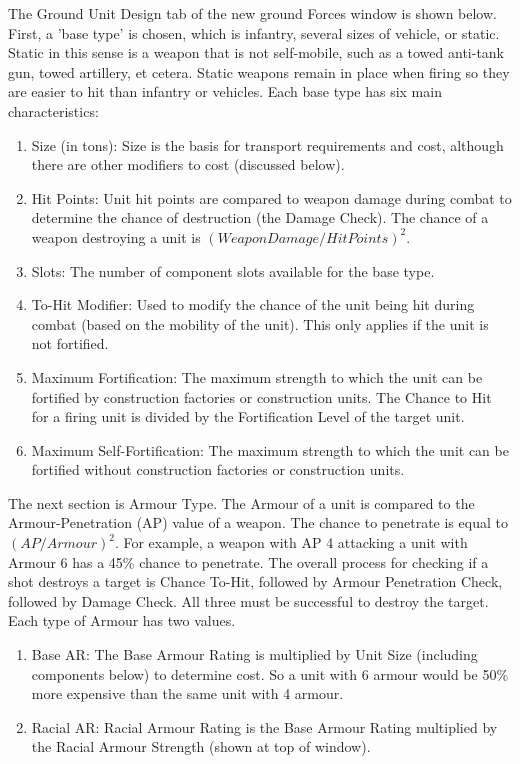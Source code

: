 \documentclass[../../../Aurora C# unofficial manual.tex]{subfiles}
\begin{document}
	The Ground Unit Design tab of the new ground Forces window is shown below. First, a 'base type' is chosen, which is infantry, several sizes of vehicle, or static. Static in this sense is a weapon that is not self-mobile, such as a towed anti-tank gun, towed artillery, et cetera. Static weapons remain in place when firing so they are easier to hit than infantry or vehicles. Each base type has six main characteristics:
	\begin{enumerate}
		\item Size (in tons): Size is the basis for transport requirements and cost, although there are other modifiers to cost (discussed below).
		\item Hit Points: Unit hit points are compared to weapon damage during combat to determine the chance of destruction (the Damage Check). The chance of a weapon destroying a unit is \( (Weapon Damage / Hit Points)^{2} \).
		\item Slots: The number of component slots available for the base type.
		\item To-Hit Modifier: Used to modify the chance of the unit being hit during combat (based on the mobility of the unit). This only applies if the unit is not fortified.
		\item Maximum Fortification: The maximum strength to which the unit can be fortified by construction factories or construction units. The Chance to Hit for a firing unit is divided by the Fortification Level of the target unit.
		\item Maximum Self-Fortification: The maximum strength to which the unit can be fortified without construction factories or construction units.
	\end{enumerate}
	
	The next section is Armour Type. The Armour of a unit is compared to the Armour-Penetration (AP) value of a weapon. The chance to penetrate is equal to \( (AP / Armour)^{2} \). For example, a weapon with AP 4 attacking a unit with Armour 6 has a 45\% chance to penetrate. The overall process for checking if a shot destroys a target is Chance To-Hit, followed by Armour Penetration Check, followed by Damage Check. All three must be successful to destroy the target. Each type of Armour has two values.
	\begin{enumerate}
		\item Base AR: The Base Armour Rating is multiplied by Unit Size (including components below) to determine cost. So a unit with 6 armour would be 50\% more expensive than the same unit with 4 armour.
		\item Racial AR: Racial Armour Rating is the Base Armour Rating multiplied by the Racial Armour Strength (shown at top of window).
	\end{enumerate}
	
\end{document}
